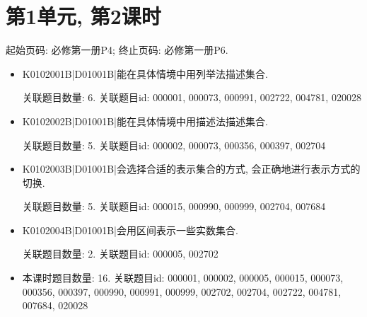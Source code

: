 \section*{第1单元, 第2课时}
起始页码: 必修第一册P4; 终止页码: 必修第一册P6.
\begin{itemize}
\item K0102001B|D01001B|能在具体情境中用列举法描述集合.

关联题目数量: 6. 关联题目id: 000001, 000073, 000991, 002722, 004781, 020028

\item K0102002B|D01001B|能在具体情境中用描述法描述集合.

关联题目数量: 5. 关联题目id: 000002, 000073, 000356, 000397, 002704

\item K0102003B|D01001B|会选择合适的表示集合的方式, 会正确地进行表示方式的切换.

关联题目数量: 5. 关联题目id: 000015, 000990, 000999, 002704, 007684

\item K0102004B|D01001B|会用区间表示一些实数集合.

关联题目数量: 2. 关联题目id: 000005, 002702

\item 本课时题目数量: 16. 关联题目id: 000001, 000002, 000005, 000015, 000073, 000356, 000397, 000990, 000991, 000999, 002702, 002704, 002722, 004781, 007684, 020028

\end{itemize}

